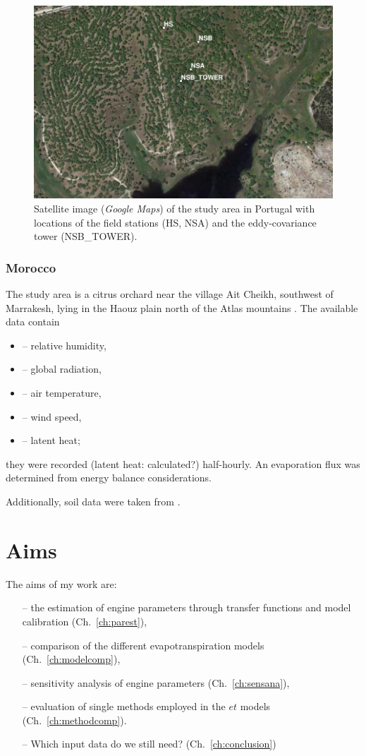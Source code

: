 \documentclass{scrreprt}
\newenvironment{denseitem}{
  \begin{itemize}
    \setlength{\itemsep}{0pt}
    \setlength{\parskip}{0pt}
    \setlength{\parsep}{0pt}
}{
  \end{itemize}
}
\begin{document}
\begin{figure}[ht]
  \centering
  \includegraphics[width=0.7\hsize]{./map_coruche}
  \caption{Satellite image (\emph{Google Maps}) of the study area in Portugal with locations of the field stations (HS, NSA) and the eddy-covariance tower (NSB\_TOWER).}
  \label{fig:map_coruche}
\end{figure}


\subsection{Morocco} \label{ssec:intro_areas_morocco}

The study area is a citrus orchard near the village Ait Cheikh, southwest of Marrakesh, lying in the Haouz plain north of the Atlas mountains \citep{mroos14}.
The available data contain
\begin{denseitem}
  \item[--] relative humidity,
  \item[--] global radiation,
  \item[--] air temperature,
  \item[--] wind speed,
  \item[--] latent heat;
\end{denseitem}
%
they were recorded (latent heat: calculated?) half-hourly.
An evaporation flux was determined from energy balance considerations.

Additionally, soil data were taken from \citet{mroos14}.


\chapter{Aims} \label{ch:aims}

The aims of my work are:
\begin{itemize}
  \item[--] the estimation of engine parameters through transfer functions and model calibration (Ch.~\ref{ch:parest}),
  \item[--] comparison of the different evapotranspiration models (Ch.~\ref{ch:modelcomp}),
  \item[--] sensitivity analysis of engine parameters (Ch.~\ref{ch:sensana}),
  \item[--] evaluation of single methods employed in the $et$ models (Ch.~\ref{ch:methodcomp}).
  \item[--] Which input data do we still need? (Ch.~\ref{ch:conclusion})
\end{itemize}
\end{document}
